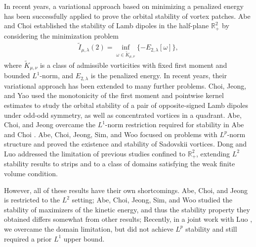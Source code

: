 \documentclass[11pt,letterpaper]{amsart}
\theoremstyle{definition}
\theoremstyle{remark}
\newcommand{\R}{\mathbb{R}}
\numberwithin{equation}{section}
\begin{document}

In recent years, a variational approach based on minimizing a penalized energy has been successfully applied to prove the orbital stability of vortex patches. Abe and Choi \cite{abe2022stability} established the stability of Lamb dipoles in the half-plane $\R_+^2$ by considering the minimization problem
\begin{align*}
    \widetilde{I}_{\mu,\lambda}(2)=\inf_{\omega \in \widetilde{K}_{\mu,\nu}}\{-E_{2,\lambda}[\omega]\}, %
\end{align*}
where $\widetilde{K}_{\mu,\nu}$ is a class of admissible vorticities with fixed first moment and bounded $L^1$-norm, and $E_{2,\lambda}$ is the penalized energy. In recent years, their variational approach has been extended to many further problems. Choi, Jeong, and Yao \cite{choi2024stability} used the monotonicity of the first moment and pointwise kernel estimates to study the orbital stability of a pair of opposite-signed Lamb dipoles under odd-odd symmetry, as well as concentrated vortices in a quadrant. Abe, Choi, and Jeong \cite{Abe2025StabilityOL} overcame the $L^1$-norm restriction required for stability in Abe and Choi \cite{abe2022stability}. Abe, Choi, Jeong, Sim, and Woo \cite{abe2025existence} focused on problems with $L^p$-norm structure and proved the existence and stability of Sadovskii vortices. Dong and Luo \cite{Dong2026StabilityOV} addressed the limitation of previous studies confined to $\R^2_+$, extending $L^2$ stability results to strips and to a class of domains satisfying the weak finite volume condition.

However, all of these results have their own shortcomings. Abe, Choi, and Jeong \cite{Abe2025StabilityOL} is restricted to the $L^2$ setting; Abe, Choi, Jeong, Sim, and Woo \cite{abe2025existence} studied the stability of maximizers of the kinetic energy, and thus the stability property they obtained differs somewhat from other results; 
Recently, in a joint work with Luo \cite{Dong2026StabilityOV}, we overcame
the domain limitation, but did not achieve $L^p$ stability and still required a prior $L^1$ upper bound.
\end{document}
